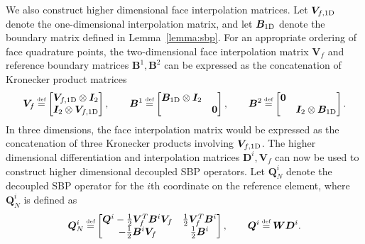 \documentclass[review,onefignum,onetabnum,final]{siamart171218}
\newcommand\myeq{\mathrel{\stackrel{\makebox[0pt]{\mbox{\normalfont\tiny def}}}{=}}}
\begin{document}
We also construct higher dimensional face interpolation matrices.  Let $\bm{V}_{f, {\rm 1D}}$ denote the one-dimensional interpolation matrix, and let $\bm{B}_{\rm 1D}$ denote the boundary matrix defined in Lemma~\ref{lemma:sbp}.  For an appropriate ordering of face quadrature points, the two-dimensional face interpolation matrix $\bm{V}_f$ and reference boundary matrices ${\bm{B}}^1, {\bm{B}}^2$ can be expressed as the concatenation of Kronecker product matrices
\[
\bm{V}_f \myeq \begin{bmatrix}
\bm{V}_{f, {\rm 1D}} \otimes \bm{I}_{2}\\
\bm{I}_{2} \otimes \bm{V}_{f, {\rm 1D}} 
\end{bmatrix}, \qquad 
{\bm{B}}^1 \myeq \begin{bmatrix}
\bm{B}_{\rm 1D} \otimes \bm{I}_{2} & \\
& \bm{0}
\end{bmatrix}, \qquad 
{\bm{B}}^2 \myeq \begin{bmatrix}
\bm{0} &\\
& \bm{I}_{2} \otimes \bm{B}_{\rm 1D} 
\end{bmatrix}.
\]
In three dimensions, the face interpolation matrix would be expressed as the concatenation of three Kronecker products involving $\bm{V}_{f, {\rm 1D}}$.  The higher dimensional differentiation and interpolation matrices $\bm{D}^i, \bm{V}_f$ can now be used to construct higher dimensional decoupled SBP operators.  Let ${\bm{Q}}^i_N$ denote the decoupled SBP operator for the $i$th coordinate on the reference element, where ${\bm{Q}}^i_N$ is defined as
\[
{\bm{Q}}^i_N \myeq \begin{bmatrix}
{\bm{Q}}^i - \frac{1}{2}\bm{V}_f^T{\bm{B}}^i\bm{V}_f & \frac{1}{2}\bm{V}_f^T{\bm{B}}^i\\
-\frac{1}{2}{\bm{B}}^i\bm{V}_f & \frac{1}{2}{\bm{B}}^i
\end{bmatrix}, \qquad {\bm{Q}}^i \myeq {\bm{W}}{\bm{D}}^i.
\]
\end{document}
